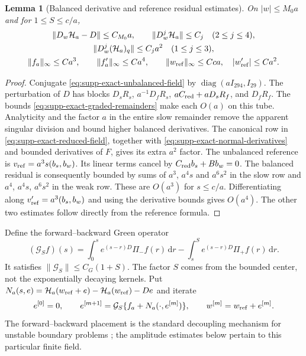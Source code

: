 \documentclass[11pt]{article}
\numberwithin{equation}{section}
\newtheorem{lemma}[lemma]{Lemma}
\theoremstyle{definition}
\theoremstyle{remark}
\newcommand{\dd}{\mathrm d}
\begin{document}
\begin{lemma}[Balanced derivative and reference residual estimates]
\label{lem:supp-exact-balanced-field}
On $|w|\le M_0a$ and for $1\le S\le c/a$,
\begin{equation}
 \begin{gathered}
 \|D_w\mathcal H_a-D\|\le C_{M_0}a,\qquad
 \|D_w^j\mathcal H_a\|\le C_j\quad(2\le j\le4),\\
 \|D_w^j(\mathcal H_a)_q\|\le C_j a^2\quad(1\le j\le3),\\
 \|f_a\|_\infty\le Ca^3,\qquad
 \|f_a'\|_\infty\le Ca^4,\qquad
 \|w_{\rm ref}\|_\infty\le Cca,\quad |w_{\rm ref}'|\le Ca^2.
 \end{gathered}
 \label{eq:supp-exact-balanced-estimates}
\end{equation}
\end{lemma}
\begin{proof}
Conjugate \eqref{eq:supp-exact-unbalanced-field} by
$\operatorname{diag}(aI_{294},I_{29})$. The perturbation of $D$ has blocks
$D_sR_s$, $a^{-1}D_fR_s$, $aC_{\rm red}+aD_sR_f$, and $D_fR_f$.
The bounds \eqref{eq:supp-exact-graded-remainders} make each $O(a)$ on
this tube. Analyticity and the factor $a$ in the entire slow remainder
remove the apparent singular division and bound higher balanced derivatives.
The canonical row in \eqref{eq:supp-exact-reduced-field}, together with
\eqref{eq:supp-exact-normal-derivatives} and bounded derivatives of $F$,
gives its extra $a^2$ factor.
The unbalanced reference is $v_{\rm ref}=a^3s(b_s,b_w)$.
Its linear terms cancel by $C_{\rm red}b_s+Bb_w=0$. The balanced residual
is consequently bounded by sums of $a^3$, $a^4s$ and $a^6s^2$ in the
slow row and $a^4$, $a^4s$, $a^6s^2$ in the weak row. These are $O(a^3)$
for $s\le c/a$. Differentiating along $v_{\rm ref}'=a^3(b_s,b_w)$ and
using the derivative bounds gives $O(a^4)$. The other two estimates follow
directly from the reference formula.
\end{proof}

Define the forward--backward Green operator
\begin{equation}
 (\mathcal G_Sf)(s)=\int_0^s e^{(s-r)D}\Pi_-f(r)\,\dd r
                  -\int_s^S e^{(s-r)D}\Pi_+f(r)\,\dd r.
 \label{eq:supp-exact-green}
\end{equation}
It satisfies $\|\mathcal G_S\|\le C_G(1+S)$. The factor $S$ comes from
the bounded center, not the exponentially decaying kernels. Put
$N_a(s,e)=\mathcal H_a(w_{\rm ref}+e)-\mathcal H_a(w_{\rm ref})-De$
and iterate
\begin{equation}
 e^{[0]}=0,\qquad
 e^{[m+1]}=\mathcal G_S\{f_a+N_a(\cdot,e^{[m]})\},\qquad
 w^{[m]}=w_{\rm ref}+e^{[m]}.
 \label{eq:supp-exact-nonlinear-sweeps}
\end{equation}
The forward--backward placement is the standard decoupling mechanism for
unstable boundary problems \cite{Mattheij1985}; the amplitude estimates
below pertain to this particular finite field.
\end{document}
